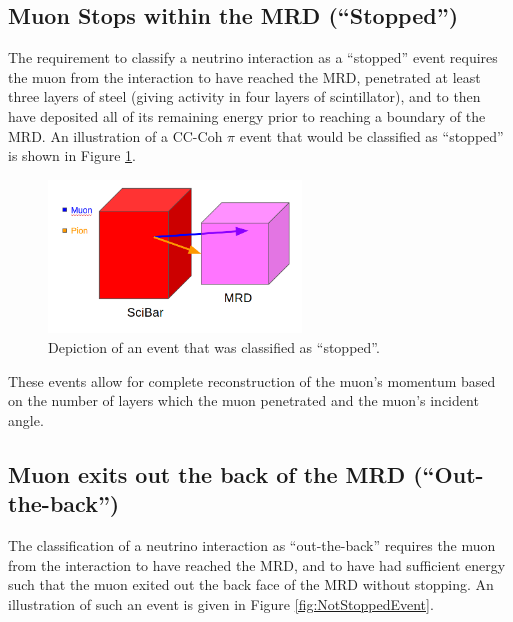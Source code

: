 \documentclass[11pt]{article}
\begin{document}
\subsection{Muon Stops within the MRD (``Stopped'')}
\label{sub:stoppedMRD}
The requirement to classify a neutrino interaction as a ``stopped'' event requires the muon from the interaction to have reached the MRD, penetrated at least three layers of steel (giving activity in four layers of scintillator), and to then have deposited all of its remaining energy prior to reaching a boundary of the MRD. An illustration of a CC-Coh $\pi$ event that would be classified as ``stopped'' is shown in Figure \ref*{fig:stoppedEvent}.

\begin{figure}[H]
\centering
\includegraphics[width=0.6\textwidth]{EventClassifications/Stopped.png}
\caption{Depiction of an event that was classified as ``stopped''.}
\label{fig:stoppedEvent}
\end{figure}

These events allow for complete reconstruction of the muon's momentum based on the number of layers which the muon penetrated and the muon's incident angle.

\subsection{Muon exits out the back of the MRD (``Out-the-back'')}
\label{sub:outback}
The classification of a neutrino interaction as ``out-the-back'' requires the muon from the interaction to have reached the MRD, and to have had sufficient energy such that the muon exited out the back face of the MRD without stopping. An illustration of such an event is given in Figure \ref*{fig:NotStoppedEvent}. 
\end{document}
